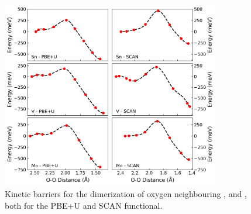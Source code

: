 \begin{refsection}

\begin{figure}[h]
\centering
\includegraphics[width=0.85\textwidth]{figures/batteries/substitution_dimers.png}
\caption{Kinetic barriers for the dimerization of oxygen neighbouring ,  and , both for the PBE+U and SCAN functional. }
\label{batteries:fig-substitution_dimers}
\end{figure}


\end{refsection}
